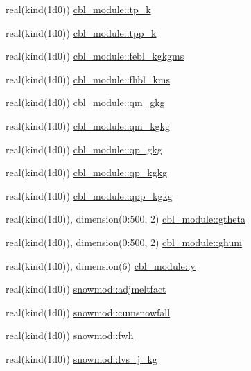 \begin{DoxyCompactItemize}
\item 
real(kind(1d0)) \hyperlink{namespacecbl__module_af9b1b9c8cf1a15dca9b8750920a048c3}{cbl\+\_\+module\+::tp\+\_\+k}
\item 
real(kind(1d0)) \hyperlink{namespacecbl__module_a63c8fb6ebf38a621ec616ddb04445f03}{cbl\+\_\+module\+::tpp\+\_\+k}
\item 
real(kind(1d0)) \hyperlink{namespacecbl__module_a5b2329a6a103326f5fa08282787d83aa}{cbl\+\_\+module\+::febl\+\_\+kgkgms}
\item 
real(kind(1d0)) \hyperlink{namespacecbl__module_a3bb0811c2c1eb194eff7132bb1a906ef}{cbl\+\_\+module\+::fhbl\+\_\+kms}
\item 
real(kind(1d0)) \hyperlink{namespacecbl__module_a652625bc960f05e00df2f7bf48cb7444}{cbl\+\_\+module\+::qm\+\_\+gkg}
\item 
real(kind(1d0)) \hyperlink{namespacecbl__module_aa9e98a57d9be62a92919841c4ad428b9}{cbl\+\_\+module\+::qm\+\_\+kgkg}
\item 
real(kind(1d0)) \hyperlink{namespacecbl__module_a45208115b84dad98c55d11cf93307c0c}{cbl\+\_\+module\+::qp\+\_\+gkg}
\item 
real(kind(1d0)) \hyperlink{namespacecbl__module_a19585b12b6f9726bfbda1954703b7b4d}{cbl\+\_\+module\+::qp\+\_\+kgkg}
\item 
real(kind(1d0)) \hyperlink{namespacecbl__module_a9698f773fdba998c463aa4dad50675a6}{cbl\+\_\+module\+::qpp\+\_\+kgkg}
\item 
real(kind(1d0)), dimension(0\+:500, 2) \hyperlink{namespacecbl__module_aa6c88eb40ac8bd6e5a7df04080288218}{cbl\+\_\+module\+::gtheta}
\item 
real(kind(1d0)), dimension(0\+:500, 2) \hyperlink{namespacecbl__module_a2c8e164b18520600e084ab16825b7996}{cbl\+\_\+module\+::ghum}
\item 
real(kind(1d0)), dimension(6) \hyperlink{namespacecbl__module_a3d7f7d5671cd679f69c81da2fbf797e2}{cbl\+\_\+module\+::y}
\item 
real(kind(1d0)) \hyperlink{namespacesnowmod_a5c337bba47f88549ed03afb42d5d097d}{snowmod\+::adjmeltfact}
\item 
real(kind(1d0)) \hyperlink{namespacesnowmod_a78e0393f653cfdebf0ccab83abc0b800}{snowmod\+::cumsnowfall}
\item 
real(kind(1d0)) \hyperlink{namespacesnowmod_a67018a3202a62ad0d4e7715dbfcf5e50}{snowmod\+::fwh}
\item 
real(kind(1d0)) \hyperlink{namespacesnowmod_aa988f82274f056c6d2f7ed3d37457b24}{snowmod\+::lvs\+\_\+j\+\_\+kg}
\item 

\end{DoxyCompactItemize}
